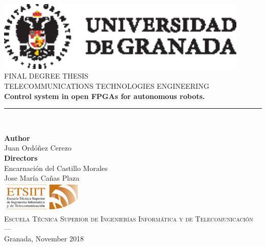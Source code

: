 \begin{titlepage}
 
 
\newlength{\centeroffset}
\setlength{\centeroffset}{-0.5\oddsidemargin}
\addtolength{\centeroffset}{0.5\evensidemargin}
\thispagestyle{empty}

\noindent\hspace*{\centeroffset}\begin{minipage}{\textwidth}

\centering
\includegraphics[width=0.9\textwidth]{imagenes/logo_ugr.eps}\\[1.4cm]


\textsc{ \Large FINAL DEGREE THESIS\\[0.2cm]}
\textsc{TELECOMMUNICATIONS TECHNOLOGIES ENGINEERING}\\[1cm]
% 
{\Huge\bfseries  Control system in open FPGAs for autonomous robots.\\
}
\noindent\rule[-1ex]{\textwidth}{3pt}\\[3.5ex]
{\large\bfseries } %
\end{minipage}

\vspace{1cm}
\noindent\hspace*{\centeroffset}\begin{minipage}{\textwidth}
\centering

\textbf{Author}\\ {Juan Ordóñez Cerezo}\\[2.5ex]
\textbf{Directors}\\
{Encarnación del Castillo Morales\\
Jose María Cañas Plaza}\\[2cm]
\includegraphics[width=0.3\textwidth]{imagenes/etsiit_logo.png}\\[0.1cm]
\textsc{Escuela Técnica Superior de Ingenierías Informática y de Telecomunicación}\\
\textsc{---}\\
Granada, November 2018
\end{minipage}
\end{titlepage}


